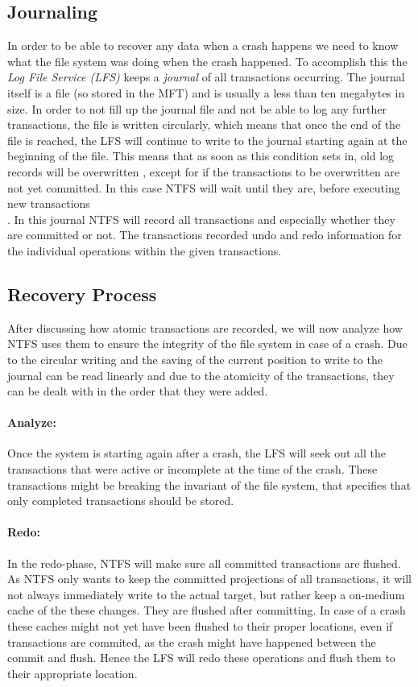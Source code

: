 \subsection{Journaling}
In order to be able to recover any data when a crash happens we need to know what the file system was doing when the crash happened. To accomplish this the \textit{Log File Service (LFS)} keeps a \textit{journal} of all transactions occurring. The journal itself is a file (so stored in the MFT) and is usually a less than ten megabytes in size. In order to not fill up the journal file and not be able to log any further transactions, the file is written circularly, which means that once the end of the file is reached, the LFS will continue to write to the journal starting again at the beginning of the file. This means that as soon as this condition sets in, old log records will be overwritten \cite{RUSSINOVICH_ET_AL:2012:WI}, except for if the transactions to be overwritten are not yet committed. In this case NTFS will wait until they are, before executing new transactions\cite{active:NTJ}\\.
In this journal NTFS will record all transactions and especially whether they are committed or not. The transactions recorded undo and redo information for the individual operations within the given transactions.
\subsection{Recovery Process}
After discussing how atomic transactions are recorded, we will now analyze how NTFS uses them to ensure the integrity of the file system in case of a crash. Due to the circular writing and the saving of the current position to write to the journal can be read linearly and due to the atomicity of the transactions, they can be dealt with in the order that they were added.
\paragraph{Analyze:}
Once the system is starting again after a crash, the LFS will seek out all the transactions that were active or incomplete at the time of the crash. These transactions might be breaking the invariant of the file system, that specifies that only completed transactions should be stored.
\paragraph{Redo:}
In the redo-phase, NTFS will make sure all committed transactions are flushed.
As NTFS only wants to keep the committed projections of all transactions, it will not always immediately write to the actual target, but rather keep a on-medium cache of the these changes. They are flushed after committing. In case of a crash these caches might not yet have been flushed to their proper locations, even if transactions are commited, as the crash might have happened between the commit and flush. Hence the LFS will redo these operations and flush them to their appropriate location. 
